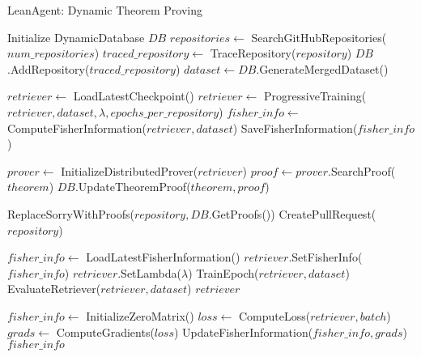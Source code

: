 \documentclass{article} %
\begin{document}
\begin{algorithm}
\caption{LeanAgent: Dynamic Theorem Proving}
\begin{algorithmic}[1]
    \State Initialize DynamicDatabase $DB$
    \State $repositories \gets$ SearchGitHubRepositories($num\_repositories$)
            \State $traced\_repository \gets$ TraceRepository($repository$)
            \State $DB$.AddRepository($traced\_repository$)
            \State $dataset \gets DB$.GenerateMergedDataset()
            
                \State $retriever \gets$ LoadLatestCheckpoint()
                \State $retriever \gets$ ProgressiveTraining($retriever, dataset, \lambda, epochs\_per\_repository$)
                \State $fisher\_info \gets$ ComputeFisherInformation($retriever, dataset$)
                \State SaveFisherInformation($fisher\_info$)
            \EndIf
            
            \State $prover \gets$ InitializeDistributedProver($retriever$)
                \State $proof \gets prover$.SearchProof($theorem$)
                    \State $DB$.UpdateTheoremProof($theorem, proof$)
                \EndIf
            \EndFor
            
            \State ReplaceSorryWithProofs($repository, DB$.GetProofs())
            \State CreatePullRequest($repository$)
        \EndIf
    \EndFor
\EndProcedure

    \State $fisher\_info \gets$ LoadLatestFisherInformation()
    \State $retriever$.SetFisherInfo($fisher\_info$)
    \State $retriever$.SetLambda($\lambda$)
        \State TrainEpoch($retriever, dataset$)
        \State EvaluateRetriever($retriever, dataset$)
    \EndFor
    \State \Return $retriever$
\EndProcedure

    \State $fisher\_info \gets$ InitializeZeroMatrix()
        \State $loss \gets$ ComputeLoss($retriever, batch$)
        \State $grads \gets$ ComputeGradients($loss$)
        \State UpdateFisherInformation($fisher\_info, grads$)
    \EndFor
    \State \Return $fisher\_info$
\EndProcedure
\end{algorithmic}
\end{algorithm}
\end{document}

